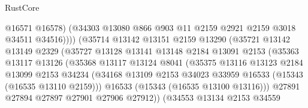\begin{lexlean}{RustCore}
\begin{coremodule}
                                  @16571
                                  @16578)
                                (@34303
                                  @13080
                                  @866
                                  @903
                                  @11
                                  @2159
                                  @2921
                                  @2159
                                  @3018
                                  @34511
                                  @34516))))
                          (@35714
                            @13142
                            @13151
                            @2159
                            @13290
                            (@35721
                              @13142
                              @13149
                              @2329
                              (@35727
                                @13128
                                @13141
                                @13148
                                @2184
                                @13091
                                @2153
                                (@35363
                                  @13117
                                  @13126
                                  (@35368
                                    @13117
                                    @13124
                                    @8041
                                    (@35375
                                      @13116
                                      @13123
                                      @2184
                                      @13099
                                      @2153
                                      @34234
                                      (@34168
                                        @13109
                                        @2153
                                        @34023
                                        @33959
                                        @16533
                                        (@15343 (@16535 @13110 @2159)))
                                      @16533
                                      (@15343 (@16535 @13100 @13116)))
                                    @27891
                                    @27894
                                    @27897
                                    @27901
                                    @27906
                                    @27912))
                                (@34553
                                  @13134
                                  @2153
                                  @34559

\end{coremodule}
\end{lexlean}
